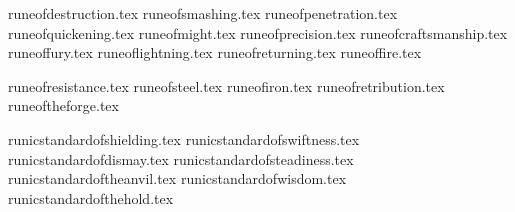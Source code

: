 

\runicspecialitemsintro

\subtitle{\runicweaponenchantments}

\runicweaponenchantmentsdef

\def\runeofreturningshootingprofile{%
	\range{8}, \shots{1}, \St{} \asuser{}, \AP{} \asuser{}, \alphaorderlistbf{\quicktofire{},\accurate{},\reload{}}%
}
\raggedcolumns
\begin{multicols}{2}
	\startsortedpricelistNSP
	{runeofdestruction.tex}
	{runeofsmashing.tex}
	{runeofpenetration.tex}
	{runeofquickening.tex}
	{runeofmight.tex}
	{runeofprecision.tex}
	{runeofcraftsmanship.tex}
	{runeoffury.tex}
	{runeoflightning.tex}
	{runeofreturning.tex}
	{runeoffire.tex}
	\endsortedpricelistNSP

\end{multicols}

\newpage
\subtitle{\runicarmourenchantments}

\runicarmourenchantmentsdef

\raggedcolumns
\begin{multicols}{2}
	\startsortedpricelistNSP
	{runeofresistance.tex}
	{runeofsteel.tex}
	{runeofiron.tex}
	{runeofretribution.tex}
	{runeoftheforge.tex}
	\endsortedpricelistNSP
\end{multicols}

\subtitle{\runicbannerenchantments}

\runicbannerenchantmentsdef

\raggedcolumns
\begin{multicols}{2}
	\startsortedpricelistNSP
	{runicstandardofshielding.tex}
	{runicstandardofswiftness.tex}
	{runicstandardofdismay.tex}
	{runicstandardofsteadiness.tex}
	{runicstandardoftheanvil.tex}
	{runicstandardofwisdom.tex}
	{runicstandardofthehold.tex}
	\endsortedpricelistNSP
\end{multicols}

